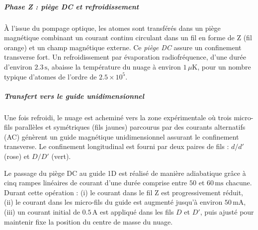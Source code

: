 
\subparagraph{Phase Z : piège DC et refroidissement}
À l’issue du pompage optique, les atomes sont transférés dans un piège magnétique combinant un courant continu circulant dans un fil en forme de Z (fil orange) et un champ magnétique externe. Ce \emph{piège DC} assure un confinement transverse fort. Un refroidissement par évaporation radiofréquence, d’une durée d’environ \(2.3\,\mathrm{s}\), abaisse la température du nuage à environ \(1\,\mu\mathrm{K}\), pour un nombre typique d’atomes de l’ordre de \(2.5\times 10^5\).

\subparagraph{Transfert vers le guide unidimensionnel}
Une fois refroidi, le nuage est acheminé vers la zone expérimentale où trois micro-fils parallèles et symétriques (fils jaunes) parcourus par des courants alternatifs (AC) génèrent un guide magnétique unidimensionnel assurant le confinement transverse. Le confinement longitudinal est fourni par deux paires de fils : $d/d'$ (rose) et $D/D'$ (vert).

Le passage du piège DC au guide 1D est réalisé de manière adiabatique grâce à cinq rampes linéaires de courant d’une durée comprise entre \(50\) et \(60\,\mathrm{ms}\) chacune. Durant cette opération :  
(i) le courant dans le fil Z est progressivement réduit,  
(ii) le courant dans les micro-fils du guide est augmenté jusqu’à environ \(50\,\mathrm{mA}\),  
(iii) un courant initial de \(0.5\,\mathrm{A}\) est appliqué dans les fils $D$ et $D'$, puis ajusté pour maintenir fixe la position du centre de masse du nuage.  

